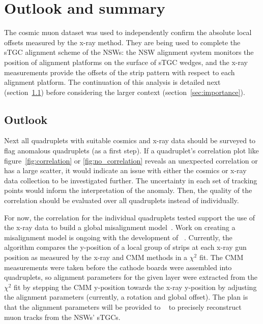 
\chapter{Outlook and summary}
\label{chap:summary}

The cosmic muon dataset was used to independently confirm the absolute local offsets measured by the x-ray method. They are being used to complete the sTGC alignment scheme of the NSWs: the NSW alignment system monitors the position of alignment platforms on the surface of sTGC wedges, and the x-ray measurements provide the offsets of the strip pattern with respect to each alignment platform. The continuation of this analysis is detailed next (section~\ref{sec:outlook}) before considering the larger context (section~\ref{sec:importance}). 

\section{Outlook}
\label{sec:outlook}

Next all quadruplets with suitable cosmics and x-ray data should be surveyed to flag anomalous quadruplets (as a first step). If a quadruplet's correlation plot like figure~\ref{fig:correlation} or \ref{fig:no_correlation} reveals an unexpected correlation or has a large scatter, it would indicate an issue with either the cosmics or x-ray data collection to be investigated further. The uncertainty in each set of tracking points would inform the interpretation of the anomaly. Then, the quality of the correlation should be evaluated over all quadruplets instead of individually. 
 
For now, the correlation for the individual quadruplets tested support the use of the x-ray data to build a global misalignment model~\cite{lefebvre_precision_2020}. Work on creating a misalignment model is ongoing with the development of ~\cite{lefebvre_stgc_as_built_fit}. Currently, the algorithm compares the y-position of a local group of strips at each x-ray gun position as measured by the x-ray and CMM methods in a $\chi^2$ fit. The CMM measurements were taken before the cathode boards were assembled into quadruplets, so alignment parameters for the given layer were extracted from the $\chi^2$ fit by stepping the CMM y-position towards the x-ray y-position by adjusting the alignment parameters (currently, a rotation and global offset). The plan is that the alignment parameters will be provided to ~\cite{the_atlas_collaboration_athena} to precisely reconstruct muon tracks from the NSWs' sTGCs.

